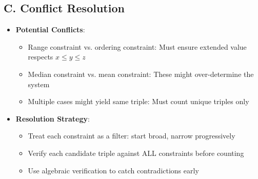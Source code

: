 \documentclass[11pt]{article}
\begin{document}
\begin{techniquesbox}
\subsection*{C. Conflict Resolution}
\begin{itemize}[leftmargin=*]
    \item \textbf{Potential Conflicts}:
    \begin{itemize}
        \item Range constraint vs. ordering constraint: Must ensure extended value respects $x \leq y \leq z$
        \item Median constraint vs. mean constraint: These might over-determine the system
        \item Multiple cases might yield same triple: Must count unique triples only
    \end{itemize}
    
    \item \textbf{Resolution Strategy}: 
    \begin{itemize}
        \item Treat each constraint as a filter: start broad, narrow progressively
        \item Verify each candidate triple against ALL constraints before counting
        \item Use algebraic verification to catch contradictions early
    \end{itemize}
\end{itemize}
\end{techniquesbox}
\end{document}

